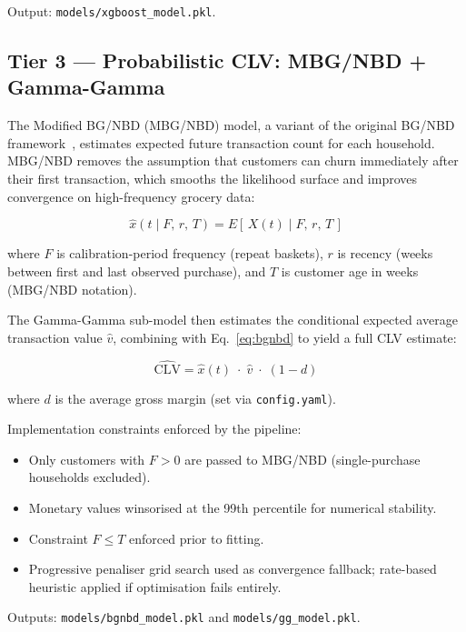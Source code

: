 \documentclass[conference]{IEEEtran}
\begin{document}
Output: \texttt{models/xgboost\_model.pkl}.

\subsection{Tier 3 --- Probabilistic CLV: MBG/NBD + Gamma-Gamma}

The Modified BG/NBD (MBG/NBD) model, a variant of the original
BG/NBD framework~\cite{fader2005, platzer2016}, estimates expected future
transaction count for each household. MBG/NBD removes the
assumption that customers can churn immediately after their
first transaction, which smooths the likelihood surface and
improves convergence on high-frequency grocery data:

\begin{equation}
  \hat{x}(t \mid F,\, r,\, T)
  = E\!\left[\,X(t) \mid F,\, r,\, T\,\right]
  \label{eq:bgnbd}
\end{equation}

where $F$ is calibration-period frequency (repeat baskets), $r$
is recency (weeks between first and last observed purchase), and
$T$ is customer age in weeks (MBG/NBD notation).

The Gamma-Gamma sub-model then estimates the conditional expected
average transaction value $\hat{v}$, combining with
Eq.~\eqref{eq:bgnbd} to yield a full CLV estimate:

\begin{equation}
  \widehat{\text{CLV}} = \hat{x}(t) \;\cdot\; \hat{v}
  \;\cdot\; (1 - d)
  \label{eq:clv}
\end{equation}

where $d$ is the average gross margin (set via
\texttt{config.yaml}).

Implementation constraints enforced by the pipeline:
\begin{itemize}
  \item Only customers with $F > 0$ are passed to MBG/NBD
        (single-purchase households excluded).
  \item Monetary values winsorised at the 99th percentile for
        numerical stability.
  \item Constraint $F \leq T$ enforced prior to fitting.
  \item Progressive penaliser grid search used as convergence
        fallback; rate-based heuristic applied if optimisation
        fails entirely.
\end{itemize}

Outputs: \texttt{models/bgnbd\_model.pkl} and
\texttt{models/gg\_model.pkl}.
\end{document}
